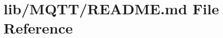 \hypertarget{lib_2_m_q_t_t_2_r_e_a_d_m_e_8md}{}\section{lib/\+M\+Q\+T\+T/\+R\+E\+A\+D\+ME.md File Reference}
\label{lib_2_m_q_t_t_2_r_e_a_d_m_e_8md}
